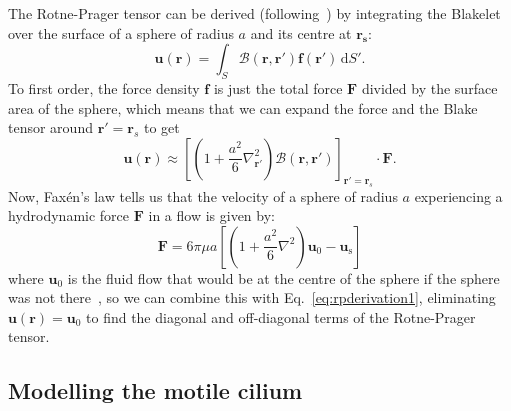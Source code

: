 \FloatBarrier

\begin{kaobox}[title=Rotne-Prager derivation]
    The Rotne-Prager tensor can be derived (following~\cite{gauger_fluid_2009}) by integrating the Blakelet over the surface of a sphere of radius $a$ and its centre at $\mathbf{r_s}$:
    \begin{equation}
        \mathbf{u}(\mathbf{r}) = \int_S \mathcal{B}(\mathbf{r}, \mathbf{r}') \mathbf{f}(\mathbf{r}') \, \mathrm{d}S'.
    \end{equation}
    To first order, the force density $\mathbf{f}$ is just the total force $\mathbf{F}$ divided by the surface area of the sphere, which means that we can expand the force and the Blake tensor around $\mathbf{r}'=\mathbf{r}_s$ to get
    \begin{equation}
        \mathbf{u}(\mathbf{r}) \approx \left[ \left( 1 + \frac{a^2}{6} \nabla^2_{\mathbf{r}'} \right) \mathcal{B}(\mathbf{r}, \mathbf{r}') \right]_{\mathbf{r}' = \mathbf{r}_s} \cdot \mathbf{F}.\label{eq:rpderivation1}
    \end{equation}
    Now, Faxén's law tells us that the velocity of a sphere of radius $a$ experiencing a hydrodynamic force $\mathbf{F}$ in a flow is given by:
    \begin{equation}
        \mathbf{F} = 6\pi\mu a \left[ \left( 1 + \frac{a^2}{6}\nabla^2 \right) \mathbf{u}_0 - \mathbf{u}_\text{s} \right]
    \end{equation}
    where $\mathbf{u}_0$ is the fluid flow that would be at the centre of the sphere if the sphere was not there~\cite{guazzelli_physical_2011}, so we can combine this with Eq.~\eqref{eq:rpderivation1}, eliminating $\mathbf{u}(\mathbf{r})=\mathbf{u}_0$ to find the diagonal and off-diagonal terms of the Rotne-Prager tensor.
\end{kaobox}

\subsection{Modelling the motile cilium}


